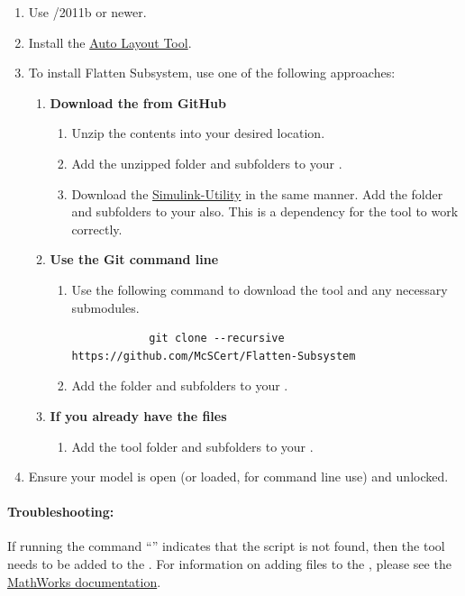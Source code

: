 \documentclass{article}
\makeatletter
\newcommand{\ToolName}{Flatten Subsystem\@\xspace}
\makeatother
\begin{document}
\begin{enumerate}
	\item Use \Matlab/\Simulink 2011b or newer.
	\item Install the \href{https://github.com/McSCert/Auto-Layout}{Auto Layout Tool}.
	\item To install \ToolName, use one of the following approaches:
\begin{enumerate}
		\item \textbf{Download the  from GitHub}
		\begin{enumerate} 
			\item Unzip the contents into your desired location. 
			\item Add the unzipped folder and subfolders to your \mpath. 
			\item Download the \href{https://github.com/McSCert/Simulink-Utility}{Simulink-Utility} in the same manner. Add the folder and subfolders to your \mpath also. This is a dependency for the tool to work correctly.
		\end{enumerate}
		\item \textbf{Use the Git command line}
		\begin{enumerate}
			\item Use the following command to download the tool and any necessary submodules. 
			\begin{verbatim}
			git clone --recursive https://github.com/McSCert/Flatten-Subsystem
			\end{verbatim}
			\item Add the folder and subfolders to your \mpath. 
		\end{enumerate}
		\item \textbf{If you already have the files}
		\begin{enumerate}
			\item Add the tool folder and subfolders to your \mpath. 
		\end{enumerate}
	\end{enumerate}

	\item Ensure your model is open (or loaded, for command line use) and unlocked.
\end{enumerate}

\paragraph{Troubleshooting:} If running the command ``'' indicates that the script is not found, then the tool needs to be added to the \mpath.	For information on adding files to the \mpath, please see the \href{https://www.mathworks.com/help/matlab/matlab_env/add-remove-or-reorder-folders-on-the-search-path.html}{MathWorks documentation}.
\end{document}
